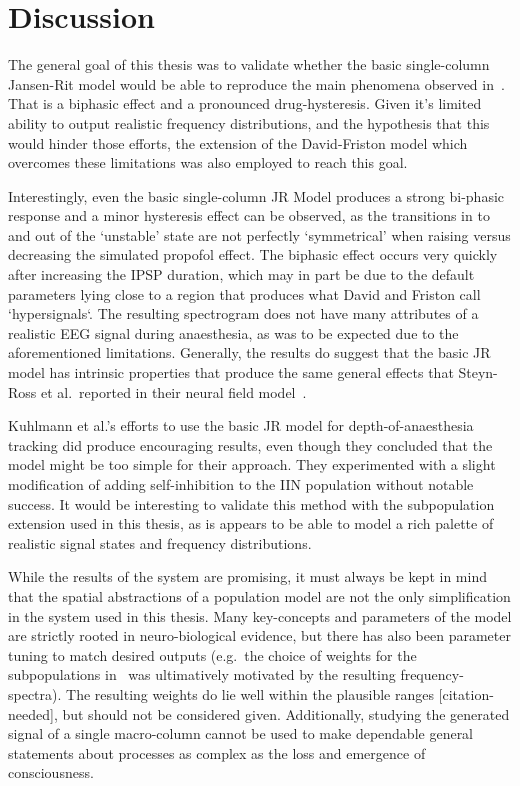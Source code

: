 \chapter{Discussion}
The general goal of this thesis was to validate whether the basic single-column Jansen-Rit model would be able to
reproduce the main phenomena observed in~\cite{hutt_progress_2011}.
That is a biphasic effect and a pronounced drug-hysteresis.
Given it's limited ability to output realistic frequency distributions,
and the hypothesis that this would hinder those efforts,
the extension of the David-Friston model which overcomes these limitations was also employed to reach this goal.

Interestingly, even the basic single-column JR Model produces a strong bi-phasic response and a minor hysteresis effect
can be observed, as the transitions in to and out of the `unstable' state are not perfectly `symmetrical' when raising
versus decreasing the simulated propofol effect.
The biphasic effect occurs very quickly after increasing the IPSP duration, which may in part be due to the default
parameters lying close to a region that produces what David and Friston call `hypersignals`.
The resulting spectrogram does not have many attributes of a realistic EEG signal during anaesthesia,
as was to be expected due to the aforementioned limitations.
Generally, the results do suggest that the basic JR model has intrinsic properties that produce the same general
effects that Steyn-Ross et al.\ reported in their neural field model~\cite{hutt_progress_2011}.




Kuhlmann et al.'s efforts to use the basic JR model for depth-of-anaesthesia tracking did produce encouraging results,
even though they concluded that the model might be too simple for their approach.
They experimented with a slight modification of adding self-inhibition to the IIN population without notable success.
It would be interesting to validate this method with the subpopulation extension used in this thesis,
as is appears to be able to model a rich palette of realistic signal states and frequency distributions.


While the results of the system are promising, it must always be kept in mind that the spatial abstractions of a
population model are not the only simplification in the system used in this thesis.
Many key-concepts and parameters of the model are strictly rooted in neuro-biological evidence,
but there has also been parameter tuning to match desired outputs (e.g.\ the choice of weights for the subpopulations
in~\cite{david_neural_2003} was ultimatively motivated by the resulting frequency-spectra).
The resulting weights do lie well within the plausible ranges [citation-needed],
but should not be considered given.
Additionally, studying the generated signal of a single macro-column cannot be used to make dependable
general statements about processes as complex as the loss and emergence of consciousness.


